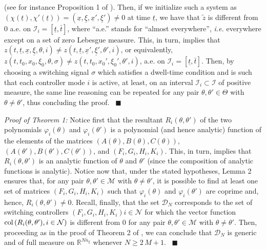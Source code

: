 \documentclass[letterpaper, 10 pt, conference]{ieeetran}
\def\qedp{\hspace*{\fill}~{\tiny $\blacksquare$}}
\begin{document}
(see for instance Proposition 1 of \cite{Ba13}).
Then, if we initialize such a system as $ (\chi (\underline t) , \chi' (\underline t) ) = (\underline x,\underline \xi, \underline x', \underline \xi') \ne 0$ at time $\underline t$,
we have that $\tilde z$ is different from $0$ a.e. on $\mathcal I_i = [\underline t , \bar t]$,
where ``a.e.'' stands for ``almost everywhere'', \emph{i.e.} everywhere 
except on a set of zero Lebesgue measure. This, in turn, implies that
$z(t,\underline t, \underline x, \underline \xi, \theta, i) \ne z(t,\underline t, \underline x', \underline \xi', \theta', i)$, or equivalently, 
$z(t,t_0, x_0, \xi_0, \theta, \sigma) \ne z(t, t_0, x_0',  \xi_0', \theta', i)$,  a.e. on $\mathcal I_i = [\underline t , \bar t]$. Then, by choosing a switching signal $\sigma$ which satisfies
a dwell-time condition and is such that each controller mode $i$ is active, at least, on an interval $\mathcal I_i \subset \mathcal I$ of positive measure, the same line reasoning can be repeated
for any pair $\theta, \theta' \in \Theta$ with $\theta \ne \theta' $, thus concluding the proof. \qedp

{\em Proof of Theorem 1:} 
Notice first that the resultant $R_i(\theta,\theta')$ of the two polynomials $\varphi_i(\theta)$ and $\varphi_i(\theta')$ is a polynomial (and hence analytic) function of the elements
of the matrices $(A(\theta), B(\theta), C(\theta))$, $(A(\theta'), B(\theta'), C(\theta'))$, and $(F_i, G_i, H_i, K_i)$. This, in turn, implies that $R_i(\theta,\theta')$ is an analytic function of $\theta$ and
$\theta'$ (since the composition of analytic functions is analytic). Notice now that, under the stated hypotheses, Lemma 2 ensures that, for any pair $\theta, \theta' \in \mathcal M$ with $\theta \ne \theta'$,
it is possible to find at least one set of matrices $(F_i, G_i, H_i, K_i)$ such that $\varphi_i(\theta)$ and $\varphi_i(\theta')$ are coprime and, hence,
$R_i(\theta,\theta') \ne 0$. Recall, finally, that the set $\mathcal D_N$ corresponds to the set of switching controllers $(F_i,G_i,H_i,K_i) i \in \mathcal N$ for which the vector function
 ${\rm col} \left ( R_i(\theta,\theta') , i \in \mathcal N \right )$ is different from $0$ for any pair $\theta, \theta' \in \mathcal M$ with $\theta \ne \theta'$.
Then, proceeding as in the proof of Theorem 2 of \cite{Sontag}, we can conclude that $\mathcal D_N$ is generic and of full measure on $\mathbb R^{N \bar n_\xi}$ whenever $N \ge 2 \, M +1$.
\qedp
\end{document}
